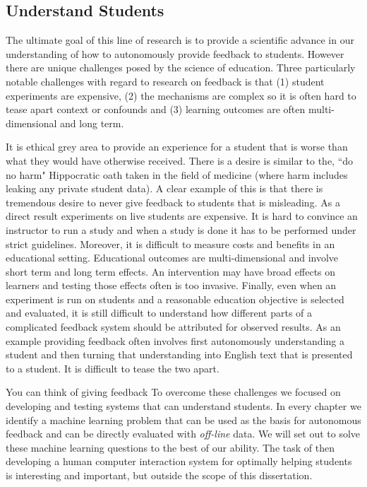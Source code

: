 \subsection{Understand Students}

The ultimate goal of this line of research is to provide a scientific advance in our understanding of how to autonomously provide feedback to students. However there are unique challenges posed by the science of education. Three particularly notable challenges with regard to research on feedback is that (1) student experiments are expensive, (2) the mechanisms are complex so it is often hard to tease apart context or confounds and (3) learning outcomes are often multi-dimensional and long term.

It is ethical grey area to provide an experience for a student that is worse than what they would have otherwise received. There is a desire is similar to the, ``do no harm" Hippocratic oath taken in the field of medicine (where harm includes leaking any private student data). A clear example of this is that there is tremendous desire to never give feedback to students that is misleading. As a direct result experiments on live students are expensive. It is hard to convince an instructor to run a study and when a study is done it has to be performed under strict guidelines. Moreover, it is difficult to measure costs and benefits in an educational setting. Educational outcomes are multi-dimensional and involve short term and long term effects. An intervention may have broad effects on learners and testing those effects often is too invasive. Finally, even when an experiment is run on students and a reasonable education objective is selected and evaluated, it is still difficult to understand how different parts of a complicated feedback system should be attributed for observed results. As an example providing feedback often involves first autonomously understanding a student and then turning that understanding into English text that is presented to a student. It is difficult to tease the two apart.

You can think of giving feedback 
To overcome these challenges we focused on developing and testing systems that can understand students. In every chapter we identify a machine learning problem that can be used as the basis for autonomous feedback and can be directly evaluated with \emph{off-line} data. We will set out to solve these machine learning questions to the best of our ability. The task of then developing a human computer interaction system for optimally helping students is interesting and important, but outside the scope of this dissertation.

